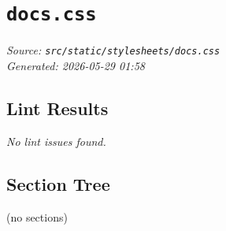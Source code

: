 
\section{\texttt{docs.css}}
\textit{Source: \texttt{src/static/stylesheets/docs.css}} \\
\textit{Generated: 2026-05-29 01:58} \\

\subsection{Lint Results}
\textit{No lint issues found.} \\

\subsection{Section Tree}
\begingroup
\linespread{0.9}\selectfont
\begin{verbnobox}[\FiraCode]
(no sections)
\end{verbnobox}
\endgroup
